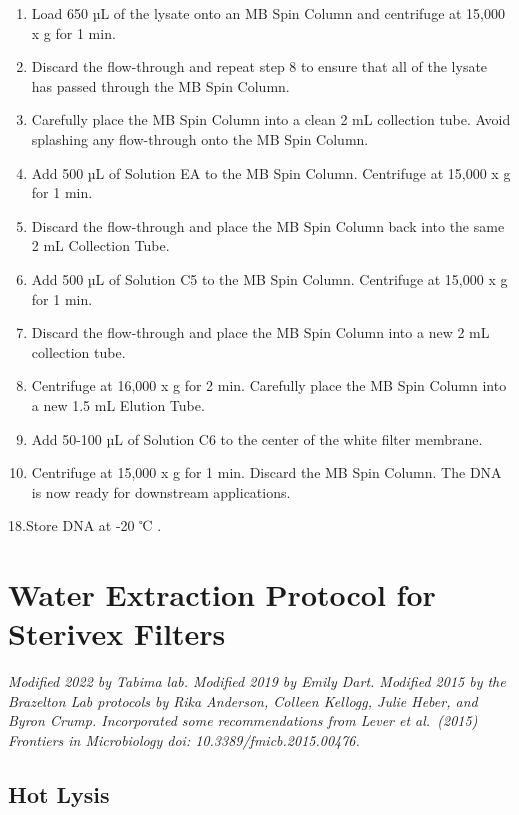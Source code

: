 \documentclass[
]{book}
\begin{document}
\begin{enumerate}
\def\labelenumi{\arabic{enumi}.}
\setcounter{enumi}{7}
\item
  Load 650 µL of the lysate onto an MB Spin Column and centrifuge at 15,000 x g for 1 min.
\item
  Discard the flow-through and repeat step 8 to ensure that all of the lysate has passed through the MB Spin Column.
\item
  Carefully place the MB Spin Column into a clean 2 mL collection tube. Avoid splashing any flow-through onto the MB Spin Column.
\item
  Add 500 µL of Solution EA to the MB Spin Column. Centrifuge at 15,000 x g for 1 min.
\item
  Discard the flow-through and place the MB Spin Column back into the same 2 mL Collection Tube.
\item
  Add 500 µL of Solution C5 to the MB Spin Column. Centrifuge at 15,000 x g for 1 min.
\item
  Discard the flow-through and place the MB Spin Column into a new 2 mL collection tube.
\item
  Centrifuge at 16,000 x g for 2 min. Carefully place the MB Spin Column into a new 1.5 mL Elution Tube.
\item
  Add 50-100 µL of Solution C6 to the center of the white filter membrane.
\item
  Centrifuge at 15,000 x g for 1 min. Discard the MB Spin Column. The DNA is now ready for downstream applications.
\end{enumerate}

18.Store DNA at -20 ℃ .

\hypertarget{water-extraction-protocol-for-sterivex-filters}{%
\chapter{Water Extraction Protocol for Sterivex Filters}\label{water-extraction-protocol-for-sterivex-filters}}

\emph{Modified 2022 by Tabima lab. Modified 2019 by Emily Dart. Modified 2015 by the Brazelton Lab protocols by Rika Anderson, Colleen Kellogg, Julie Heber, and Byron Crump. Incorporated some recommendations from Lever et al.~(2015) Frontiers in Microbiology doi: 10.3389/fmicb.2015.00476.}

\hypertarget{hot-lysis}{%
\section{Hot Lysis}\label{hot-lysis}}
\end{document}

